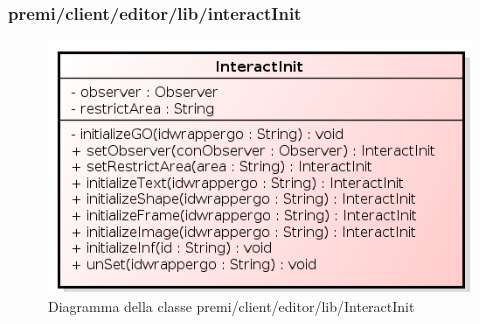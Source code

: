\subsubsection{premi/client/editor/lib/interactInit}
\begin{figure}[h]
\begin{center}
\includegraphics[scale=0.90]{img/diacla/InteractInit.png}
\caption{Diagramma della classe premi/client/editor/lib/InteractInit}
\end{center}
\end{figure}

